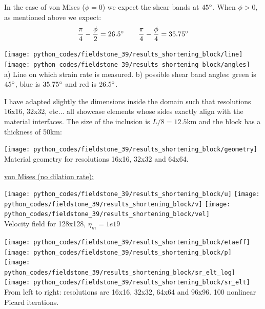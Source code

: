 In the case of von Mises ($\phi=0$) we expect the shear bands at $45\degree$. When $\phi>0$, as mentioned above
we expect:
\[
\frac{\pi}{4}-\frac{\phi}{2}=26.5\degree
\qquad
\frac{\pi}{4}-\frac{\phi}{4}=35.75\degree
\]

\begin{center}
\texttt{[image: python\_codes/fieldstone\_39/results\_shortening\_block/line]}
\texttt{[image: python\_codes/fieldstone\_39/results\_shortening\_block/angles]}\\
{\captionfont a) Line on which strain rate is measured. b) possible shear band angles:
green is $45\degree$, blue is $35.75\degree$ and red is $26.5\degree$.}
\end{center}


I have adapted slightly the dimensions inside the domain such that resolutions 16x16, 32x32, etc...
all showcase elements whose sides exactly align with the material interfaces. The size of the inclusion is 
$L/8=12.5$km and the block has a thickness of 50km:

\begin{center}
\texttt{[image: python\_codes/fieldstone\_39/results\_shortening\_block/geometry]}\\
{\captionfont Material geometry for resolutions 16x16, 32x32 and 64x64.}
\end{center}


\newpage
\underline{von Mises (no dilation rate):}

\begin{center}
\texttt{[image: python\_codes/fieldstone\_39/results\_shortening\_block/u]}
\texttt{[image: python\_codes/fieldstone\_39/results\_shortening\_block/v]}
\texttt{[image: python\_codes/fieldstone\_39/results\_shortening\_block/vel]}\\
{\captionfont Velocity field for 128x128, $\eta_m=1e19$}
\end{center}

\begin{center}
\texttt{[image: python\_codes/fieldstone\_39/results\_shortening\_block/etaeff]}
\texttt{[image: python\_codes/fieldstone\_39/results\_shortening\_block/p]}\\
\texttt{[image: python\_codes/fieldstone\_39/results\_shortening\_block/sr\_elt\_log]}
\texttt{[image: python\_codes/fieldstone\_39/results\_shortening\_block/sr\_elt]}\\
{\captionfont From left to right: resolutions are 16x16, 32x32, 64x64 and 96x96. 100 nonlinear Picard iterations.}
\end{center}

